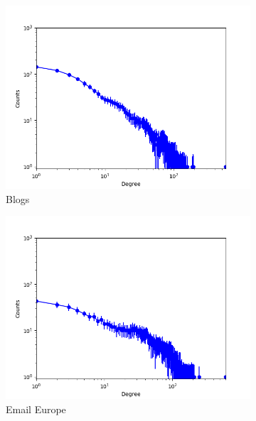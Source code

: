 \begin{figure}[h]
\begin{subfigure}[b]{0.300\textwidth}
            \includegraphics[width=\textwidth]{img/corpus/ilfm_blogs_0}
            \caption {{\small Blogs}}    
            \label{fig:mean and std of net14}
        \end{subfigure}
        \begin{subfigure}[b]{0.300\textwidth}
            \centering
            \includegraphics[width=\textwidth]{img/corpus/ilfm_emaileu_0}
            \caption {{\small Email Europe}}    
            \label{fig:mean and std of net14}
        \end{subfigure}
        \begin{subfigure}[b]{0.300\textwidth}
            \centering

\end{subfigure}
\end{figure}
